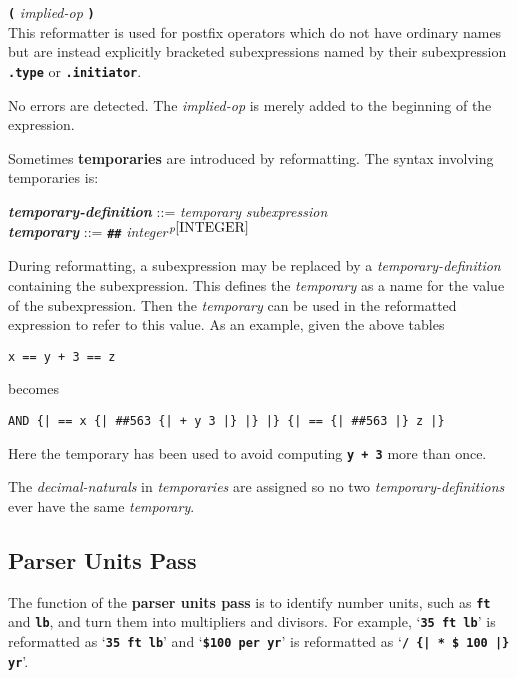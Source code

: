 \documentclass[12pt]{article}
\newcommand{\TT}[1]{{\tt \bfseries #1}}
\newcommand{\key}[1]{{\rm \bfseries #1}}
\newcommand{\ttkey}[1]{{\tt \bfseries #1}}
\newcommand{\emkey}[1]{{\em \bfseries #1}}
\newcommand{\pagnote}[1]{$\,^{p\pageref{#1}}$}
\newenvironment{indpar}[1][0.3in]%
	{\begin{list}{}%
		     {\setlength{\itemsep}{0in}%
		      \setlength{\topsep}{0in}%
		      \setlength{\parsep}{1ex}%
		      \setlength{\labelwidth}{#1}%
		      \setlength{\leftmargin}{#1}%
		      \addtolength{\leftmargin}{\labelsep}}%
	 \item}%
	{\end{list}}
\begin{document}
\begin{indpar}[0.5in]
\hspace*{-0.3in}\ttkey{implied} \TT{(} {\em implied-op} \TT{)} \\
This reformatter is used for postfix operators which do not have
ordinary names but are instead explicitly bracketed subexpressions
named by their subexpression \TT{.type} or \TT{.initiator}.

No errors are detected.  The {\em implied-op} is merely added to the
beginning of the expression.

\end{indpar}

Sometimes \key{temporaries}\label{TEMPORARY}
are introduced by reformatting.  The syntax involving temporaries is:

\begin{indpar}
\emkey{temporary-definition} ::= {\em temporary} {\em subexpression} \\[1ex]
\emkey{temporary} ::= \TT{\#\#} {\em integer}\pagnote{INTEGER}
\end{indpar}

During reformatting, a subexpression may be replaced by
a {\em temporary-definition} containing the subexpression.  This
defines the {\em temporary} as a name for the value of the subexpression.
Then the {\em temporary} can be used in the reformatted
expression to refer to this value.  As an example, given the above
tables

\begin{center}
\verb|x == y + 3 == z|
\end{center}

becomes

\begin{center}
\verb/AND {| == x {| ##563 {| + y 3 |} |} |} {| == {| ##563 |} z |}/
\end{center}

Here the temporary has been used to avoid computing \TT{y + 3}
more than once.

The {\em decimal-naturals} in {\em temporaries} are assigned so no
two {\em temporary-definitions} ever have the same {\em temporary}.

\subsection{Parser Units Pass}
\label{PARSER-UNITS-PASS}

The function of the \key{parser units pass} is to identify number
units, such as \TT{ft} and \TT{lb}, and turn them into multipliers
and divisors.  For example, `\TT{35~ft~lb}' is reformatted as
`\TT{* 35 ft lb}' and `\TT{\$100~per~yr}' is reformatted as
`\TT{/ \{| * \$ 100 |\} yr}'.
\end{document}
